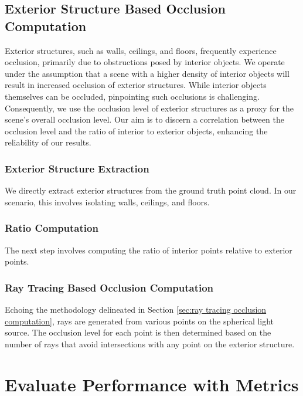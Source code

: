 \documentclass[11pt, a4paper,oneside,chapterprefix=false]{scrbook}
\begin{document}
\subsection{Exterior Structure Based Occlusion Computation} \label{sec:exterior structure occlusion computation}

Exterior structures, such as walls, ceilings, and floors, frequently experience occlusion, primarily due to obstructions posed by interior objects. We operate under the assumption that a scene with a higher density of interior objects will result in increased occlusion of exterior structures. While interior objects themselves can be occluded, pinpointing such occlusions is challenging. Consequently, we use the occlusion level of exterior structures as a proxy for the scene's overall occlusion level. Our aim is to discern a correlation between the occlusion level and the ratio of interior to exterior objects, enhancing the reliability of our results.

\subsubsection{Exterior Structure Extraction}

We directly extract exterior structures from the ground truth point cloud. In our scenario, this involves isolating walls, ceilings, and floors.

\subsubsection{Ratio Computation}

The next step involves computing the ratio of interior points relative to exterior points.

\subsubsection{Ray Tracing Based Occlusion Computation}

Echoing the methodology delineated in Section \ref{sec:ray tracing occlusion computation}, rays are generated from various points on the spherical light source. The occlusion level for each point is then determined based on the number of rays that avoid intersections with any point on the exterior structure.


\section{Evaluate Performance with Metrics}
\end{document}

